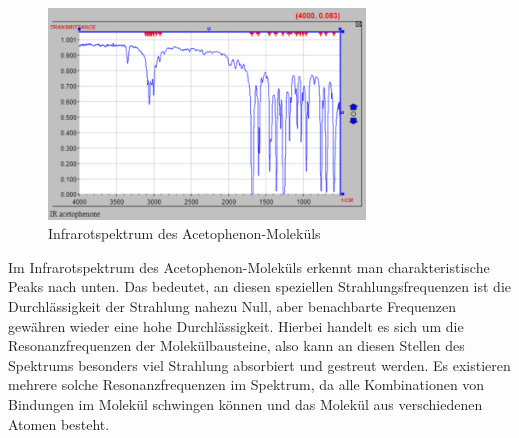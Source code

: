 \documentclass{scrartcl}
\begin{document}
\begin{figure}[h]
  \caption{Infrarotspektrum des Acetophenon-Moleküls}
  \centering
    \includegraphics[width=0.75\textwidth]{acetophenon.png}
\end{figure}
Im Infrarotspektrum des Acetophenon-Moleküls erkennt man charakteristische Peaks nach unten. Das bedeutet, an diesen speziellen Strahlungsfrequenzen ist die Durchlässigkeit der Strahlung nahezu Null, aber benachbarte Frequenzen gewähren wieder eine hohe Durchlässigkeit. Hierbei handelt es sich um die Resonanzfrequenzen der Molekülbausteine, also kann an diesen Stellen des Spektrums besonders viel Strahlung absorbiert und gestreut werden. Es existieren mehrere solche Resonanzfrequenzen im Spektrum, da alle Kombinationen von Bindungen im Molekül schwingen können und das Molekül aus verschiedenen Atomen besteht.
\end{document}
